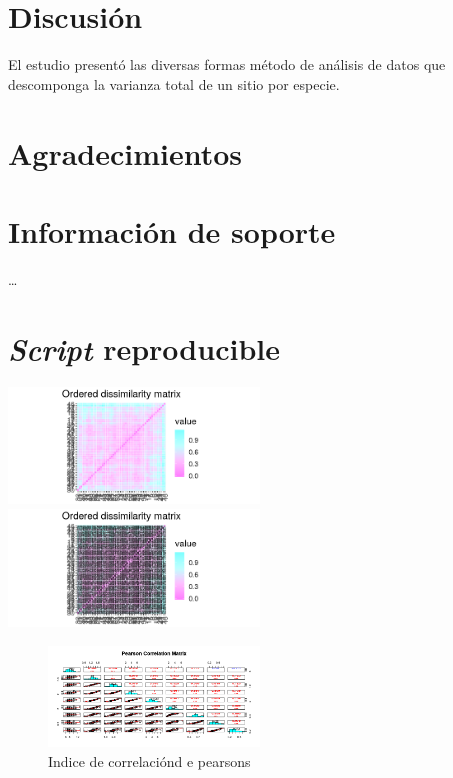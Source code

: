 \documentclass[11pt,]{article}
\begin{document}
\section{Discusión}\label{discusiuxf3n}

El estudio presentó las diversas formas método de análisis de datos que
descomponga la varianza total de un sitio por especie.

\section{Agradecimientos}\label{agradecimientos}

\section{Información de soporte}\label{informaciuxf3n-de-soporte}

\ldots

\section{\texorpdfstring{\emph{Script}
reproducible}{Script reproducible}}\label{script-reproducible}

\includegraphics[width=0.50000\textwidth]{matriz_de_dismilaridad_mejorados.png}
\includegraphics[width=0.50000\textwidth]{Matriz_disimilaridad_sobreimpresos.png}

\begin{figure}
\centering
\includegraphics[width=0.50000\textwidth]{Indice_correlacion_Pearson.png}
\caption{Indice de correlaciónd e
pearsons\label{fig:matriz_disimilaridad}}
\end{figure}
\end{document}
